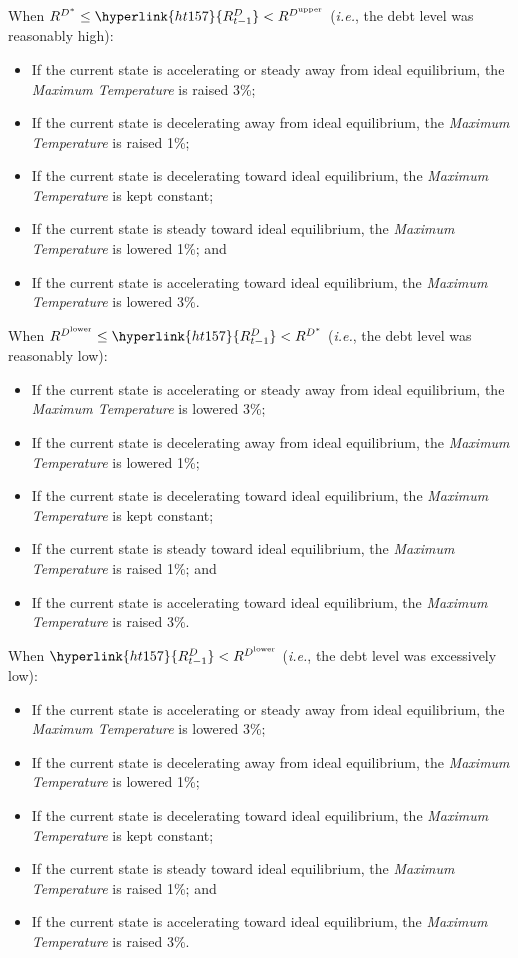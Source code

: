 \documentclass[tikz]{article}
\newcommand{\term}[1]{\textsl{#1}}
\begin{document}
When $R^{D^*} \leq \hyperlink{ht157}{R^D_{t-1}} < R^{D^{\text{upper}}}$ (\term{i.e.}, the debt level was reasonably high):
\begin{itemize}[midsep]
    \item If the current state is accelerating or steady away from ideal equilibrium, the \term{Maximum Temperature} is raised 3\%;
    \item If the current state is decelerating away from ideal equilibrium, the \term{Maximum Temperature} is raised 1\%;
    \item If the current state is decelerating toward ideal equilibrium, the \term{Maximum Temperature} is kept constant;
    \item If the current state is steady toward ideal equilibrium, the \term{Maximum Temperature} is lowered 1\%; and
    \item If the current state is accelerating toward ideal equilibrium, the \term{Maximum Temperature} is lowered 3\%.
\end{itemize}

When $ R^{D^{\text{lower}}} \leq \hyperlink{ht157}{R^D_{t-1}} < R^{D^*}$ (\term{i.e.}, the debt level was reasonably low):
\begin{itemize}[midsep]
    \item If the current state is accelerating or steady away from ideal equilibrium, the \term{Maximum Temperature} is lowered 3\%;
    \item If the current state is decelerating away from ideal equilibrium, the \term{Maximum Temperature} is lowered 1\%;
    \item If the current state is decelerating toward ideal equilibrium, the \term{Maximum Temperature} is kept constant;
    \item If the current state is steady toward ideal equilibrium, the \term{Maximum Temperature} is raised 1\%; and
    \item If the current state is accelerating toward ideal equilibrium, the \term{Maximum Temperature} is raised 3\%.
\end{itemize}

When $\hyperlink{ht157}{R^D_{t-1}} < R^{D^{\text{lower}}}$ (\term{i.e.}, the debt level was excessively low):
\begin{itemize}[midsep]
    \item If the current state is accelerating or steady away from ideal equilibrium, the \term{Maximum Temperature} is lowered 3\%;
    \item If the current state is decelerating away from ideal equilibrium, the \term{Maximum Temperature} is lowered 1\%;
    \item If the current state is decelerating toward ideal equilibrium, the \term{Maximum Temperature} is kept constant;
    \item If the current state is steady toward ideal equilibrium, the \term{Maximum Temperature} is raised 1\%; and
    \item If the current state is accelerating toward ideal equilibrium, the \term{Maximum Temperature} is raised 3\%.
\end{itemize}
\end{document}
